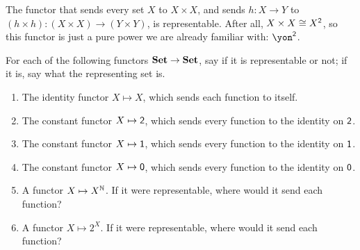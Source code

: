 \documentclass[Book-Poly]{subfiles}
\begin{document}
\begin{example}
The functor that sends every set $X$ to $X\times X$, and sends $h\colon X\to Y$ to $(h\times h)\colon (X\times X)\to(Y\times Y)$, is representable. After all, $X \times X \cong X^{\textsf{2}}$, so this functor is just a pure power we are already familiar with: $\yon^\2$.
\end{example}

\begin{exercise}\label{exc.representable_fun}
For each of the following functors $\mathbf{Set}\to\mathbf{Set}$, say if it is representable or not; if it is, say what the representing set is.
\begin{enumerate}
	\item The identity functor $X\mapsto X$, which sends each function to itself.
	\item The constant functor $X\mapsto\textsf{2}$, which sends every function to the identity on $\textsf{2}$.
	\item The constant functor $X\mapsto\textsf{1}$, which sends every function to the identity on $\textsf{1}$.
	\item The constant functor $X\mapsto\textsf{0}$, which sends every function to the identity on $\textsf{0}$.
	\item A functor $X\mapsto X^{\mathbb{N}}$.
	If it were representable, where would it send each function?
	\item A functor $X\mapsto 2^X$.
	If it were representable, where would it send each function?
\qedhere
\end{enumerate}


\end{exercise}
\end{document}
